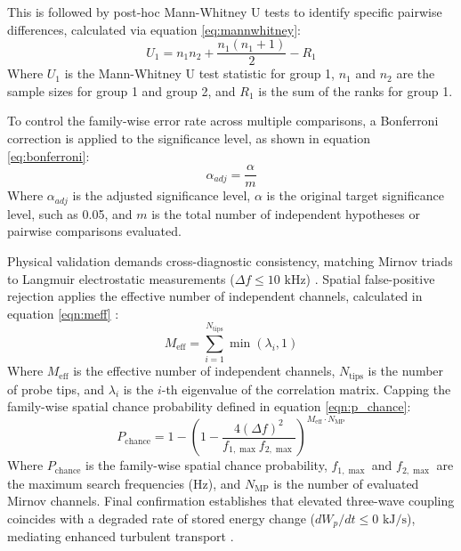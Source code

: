 This is followed by post-hoc Mann-Whitney U tests to identify specific pairwise differences, calculated via equation \ref{eq:mannwhitney}:
\begin{equation} \label{eq:mannwhitney}
U_1 = n_1 n_2 + \frac{n_1(n_1+1)}{2} - R_1
\end{equation}
Where $U_1$ is the Mann-Whitney U test statistic for group 1, $n_1$ and $n_2$ are the sample sizes for group 1 and group 2, and $R_1$ is the sum of the ranks for group 1.

To control the family-wise error rate across multiple comparisons, a Bonferroni correction is applied to the significance level, as shown in equation \ref{eq:bonferroni}:
\begin{equation} \label{eq:bonferroni}
\alpha_{adj} = \frac{\alpha}{m}
\end{equation}
Where $\alpha_{adj}$ is the adjusted significance level, $\alpha$ is the original target significance level, such as 0.05, and $m$ is the total number of independent hypotheses or pairwise comparisons evaluated.





Physical validation demands cross-diagnostic consistency, matching Mirnov triads to Langmuir electrostatic measurements ($\Delta f \le 10\text{ kHz}$) \cite{Kin2025}. Spatial false-positive rejection applies the effective number of independent channels, calculated in equation \ref{eqn:meff} \cite{Bishop2023, Afyouni2019}:
\begin{equation}
\label{eqn:meff}
M_{\text{eff}} = \sum_{i=1}^{N_{\text{tips}}} \min(\lambda_i, 1)
\end{equation}
Where $M_{\text{eff}}$ is the effective number of independent channels, $N_{\text{tips}}$ is the number of probe tips, and $\lambda_i$ is the $i$-th eigenvalue of the correlation matrix. Capping the family-wise spatial chance probability defined in equation \ref{eqn:p_chance}:
\begin{equation}
\label{eqn:p_chance}
P_{\text{chance}} = 1 - \left(1 - \frac{4 (\Delta f)^2}{f_{1,\max} f_{2,\max}}\right)^{M_{\text{eff}} \cdot N_{\text{MP}}}
\end{equation}
Where $P_{\text{chance}}$ is the family-wise spatial chance probability, $f_{1,\max}$ and $f_{2,\max}$ are the maximum search frequencies ($\text{Hz}$), and $N_{\text{MP}}$ is the number of evaluated Mirnov channels. Final confirmation establishes that elevated three-wave coupling coincides with a degraded rate of stored energy change ($dW_p/dt \le 0\text{ kJ/s}$), mediating enhanced turbulent transport \cite{Hou2019, Fujisawa2021}.